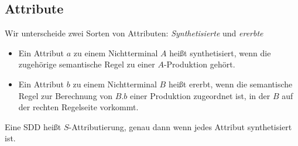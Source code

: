 \subsection{Attribute}
Wir unterscheide zwei Sorten von Attributen: \emph{Synthetisierte} und \emph{ererbte}
\begin{itemize}
 \item Ein Attribut $a$ zu einem Nichtterminal $A$ heißt synthetisiert, wenn die zugehörige semantische Regel zu einer $A$-Produktion gehört.
 \item Ein Attribut $b$ zu einem Nichtterminal $B$ heißt ererbt, wenn die semantische Regel zur Berechnung von $B.b$ einer Produktion zugeordnet ist, in der $B$ auf der rechten Regelseite vorkommt.
\end{itemize}
\Defi Eine SDD heißt $S$-Attributierung, genau dann wenn jedes Attribut synthetisiert ist.
